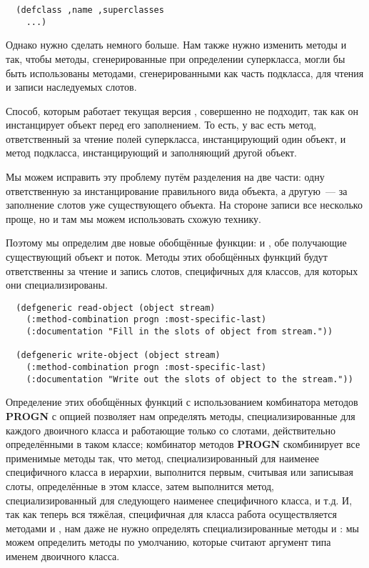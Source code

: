 \begin{lstlisting}
  (defclass ,name ,superclasses
    ...)
\end{lstlisting}

Однако нужно сделать немного больше. Нам также нужно изменить методы  и
 так, чтобы методы, сгенерированные при определении суперкласса, могли
бы быть использованы методами, сгенерированными как часть подкласса, для чтения и записи
наследуемых слотов.

Способ, которым работает текущая версия , совершенно не подходит, так как
он инстанцирует объект перед его заполнением. То есть, у вас есть метод, ответственный за
чтение полей суперкласса, инстанцирующий один объект, и метод подкласса, инстанцирующий и
заполняющий другой объект.

Мы можем исправить эту проблему путём разделения  на две части: одну
ответственную за инстанцирование правильного вида объекта, а другую~--- за заполнение
слотов уже существующего объекта. На стороне записи все несколько проще, но и там мы можем
использовать схожую технику.

Поэтому мы определим две новые обобщённые функции:  и
, обе получающие существующий объект и поток. Методы этих обобщённых
функций будут ответственны за чтение и запись слотов, специфичных для классов, для которых
они специализированы.

\begin{lstlisting}
  (defgeneric read-object (object stream)
    (:method-combination progn :most-specific-last)
    (:documentation "Fill in the slots of object from stream."))

  (defgeneric write-object (object stream)
    (:method-combination progn :most-specific-last)
    (:documentation "Write out the slots of object to the stream."))
\end{lstlisting}

Определение этих обобщённых функций с использованием комбинатора методов \textbf{PROGN} с
опцией  позволяет нам определять методы, специализированные для
каждого двоичного класса и работающие только со слотами, действительно определёнными в
таком классе; комбинатор методов \textbf{PROGN} скомбинирует все применимые методы так,
что метод, специализированный для наименее специфичного класса в иерархии, выполнится
первым, считывая или записывая слоты, определённые в этом классе, затем выполнится метод,
специализированный для следующего наименее специфичного класса, и т.д. И, так как теперь
вся тяжёлая, специфичная для класса работа осуществляется методами  и
, нам даже не нужно определять специализированные методы
 и : мы можем определить методы по умолчанию, которые
считают аргумент типа именем двоичного класса.

